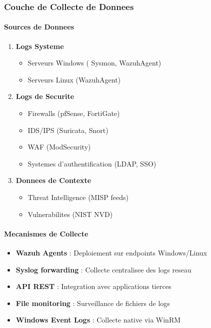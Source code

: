 \subsubsection{Couche de Collecte de Donnees}

\paragraph{Sources de Donnees}
\begin{enumerate}
    \item \textbf{Logs Systeme}
          \begin{itemize}
              \item Serveurs Windows ( Sysmon, WazuhAgent)
              \item Serveurs Linux (WazuhAgent)
          \end{itemize}


    \item \textbf{Logs de Securite}
          \begin{itemize}
              \item Firewalls (pfSense, FortiGate)
              \item IDS/IPS (Suricata, Snort)
              \item WAF (ModSecurity)
              \item Systemes d'authentification (LDAP, SSO)
          \end{itemize}

    \item \textbf{Donnees de Contexte}
          \begin{itemize}
              \item Threat Intelligence (MISP feeds)
              \item Vulnerabilites (NIST NVD)
          \end{itemize}
\end{enumerate}

\paragraph{Mecanismes de Collecte}
\begin{itemize}
    \item \textbf{Wazuh Agents} : Deploiement sur endpoints Windows/Linux
    \item \textbf{Syslog forwarding} : Collecte centralisee des logs reseau
    \item \textbf{API REST} : Integration avec applications tierces
    \item \textbf{File monitoring} : Surveillance de fichiers de logs
    \item \textbf{Windows Event Logs} : Collecte native via WinRM
\end{itemize}

